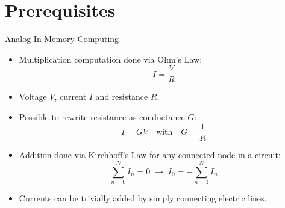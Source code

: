 \section{Prerequisites}

\begin{frame}{Analog In Memory Computing}
  \begin{itemize}
    \setlength{\itemsep}{6pt}
    \item Multiplication computation done via Ohm's Law:
          \begin{equation}
            I = \frac{V}{R}
          \end{equation}
    \item Voltage $V$, current $I$ and resistance $R$.
    \item Possible to rewrite resistance as conductance $G$:
          \begin{equation}
            I = G V \quad \text{with} \quad G = \frac{1}{R}
          \end{equation}
    \item Addition done via Kirchhoff's Law for any connected node in a circuit:
          \begin{equation}
            \sum_{n=0}^{N} I_n = 0 \;\rightarrow\; I_0 = - \sum_{n=1}^{N} I_n
          \end{equation}
    \item Currents can be trivially added by simply connecting electric lines.
  \end{itemize}
\end{frame}

